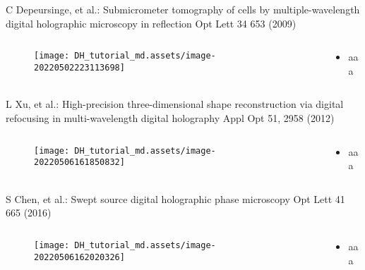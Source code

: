 \documentclass[t, aspectratio=169]{beamer}
\begin{document}
\begin{frame}{C Depeursinge, et al.: Submicrometer tomography of cells by multiple-wavelength digital holographic microscopy in reflection}
	\vspace{-3 mm}
	\small Opt Lett 34 653 (2009)
	\begin{columns}
		\begin{column}{.6\textwidth}
			\begin{figure}
				\texttt{[image: DH\_tutorial\_md.assets/image-20220502223113698]}
			\end{figure}
		\end{column}
		\begin{column}{.4\textwidth}
			\begin{itemize}
				\item aaa
			\end{itemize}
		\end{column}
	\end{columns}
\end{frame}


\begin{frame}{L Xu, et al.: High-precision three-dimensional shape reconstruction via digital refocusing in multi-wavelength digital holography}
	\vspace{-3 mm}
	\small Appl Opt 51, 2958 (2012)
	\begin{columns}
		\begin{column}{.6\textwidth}
			\begin{figure}
				\texttt{[image: DH\_tutorial\_md.assets/image-20220506161850832]}
			\end{figure}
		\end{column}
		\begin{column}{.4\textwidth}
			\begin{itemize}
				\item aaa
			\end{itemize}
		\end{column}
	\end{columns}
\end{frame}


\begin{frame}{S Chen, et al.: Swept source digital holographic phase microscopy}
	\vspace{-3 mm}
	\small Opt Lett 41 665 (2016)
	\begin{columns}
		\begin{column}{.6\textwidth}
			\begin{figure}
				\texttt{[image: DH\_tutorial\_md.assets/image-20220506162020326]}
			\end{figure}
		\end{column}
		\begin{column}{.4\textwidth}
			\begin{itemize}
				\item aaa
			\end{itemize}
		\end{column}
	\end{columns}
\end{frame}
\end{document}
